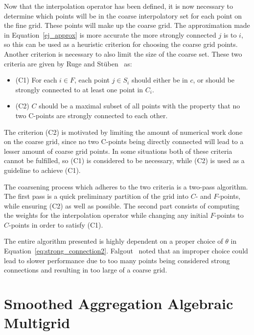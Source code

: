 Now that the interpolation operator has been defined, it is now necessary to determine which points will be in the coarse interpolatory set for each point on the fine grid. These points will make up the coarse grid. The approximation made in Equation~\ref{ej_approx} is more accurate the more strongly connected $j$ is to $i$, so this can be used as a heuristic criterion for choosing the coarse grid points. Another criterion is necessary to also limit the size of the coarse set. These two criteria are given by Ruge and Stüben~\cite{Ruge1987} as:

\begin{itemize}
	\item (C1) For each $i \in F$, each point $j \in S_i$ should either be in $c$, or should be strongly connected to at least one point in $C_i$.
	\item (C2) $C$ should be a maximal subset of all points with the property that no two C-points are strongly connected to each other.
\end{itemize}

The criterion (C2) is motivated by limiting the amount of numerical work done on the coarse grid, since no two C-points being directly connected will lead to a lesser amount of coarse grid points. In some situations both of these criteria cannot be fulfilled, so (C1) is considered to be necessary, while (C2) is used as a guideline to achieve (C1).

The coarsening process which adheres to the two criteria is a two-pass algorithm. The first pass is a quick preliminary partition of the grid into $C$- and $F$-points, while ensuring (C2) as well as possible. The second part consists of computing the weights for the interpolation operator while changing any initial $F$-points to $C$-points in order to satisfy (C1).

The entire algorithm presented is highly dependent on a proper choice of $\theta$ in Equation~\ref{eq:strong_connection2}. Falgout~\cite{Falgout2006} noted that an improper choice could lead to slower performance due to too many points being considered strong connections and resulting in too large of a coarse grid.

\section{Smoothed Aggregation Algebraic Multigrid}

